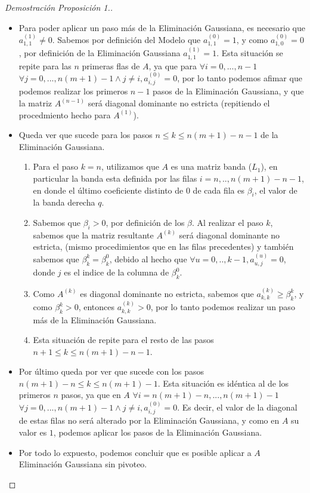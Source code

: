 \begin{proof}[Demostración Proposición 1.]
\begin{itemize}
\item Para poder aplicar un paso más de la Eliminación Gaussiana, es necesario que $a^{(1)}_{1,1} \neq 0$. Sabemos por definición del Modelo que $a^{(0)}_{1,1} = 1$, y como $a^{(0)}_{1,0} = 0$, por definición de la Eliminación Gaussiana $a^{(1)}_{1,1} = 1$. Esta situación se repite para las $n$ primeras flas de $A$, ya que para $\forall i=0,...,n-1$ $\forall j=0,...,n(m+1)-1 \land j \neq i, a^{(0)}_{i,j} = 0$, por lo tanto podemos afimar que podemos realizar los primeros $n-1$ pasos de la Eliminación Gaussiana, y que la matriz $A^{(n-1)}$ será diagonal dominante no estricta (repitiendo el procedmiento hecho para $A^{(1)}$).

\item Queda ver que sucede para los pasos $n \leq k \leq n(m+1)-n-1$ de la Eliminación Gaussiana. 
  \begin{enumerate}[label=\Roman*]
      \item Para el paso $k=n$, utilizamos que $A$ es una matriz banda ($L_{1}$), en particular la banda esta definida por las filas $i=n,..,n(m+1)-n-1$, en donde el último coeficiente distinto de 0 de cada fila es $\beta_{i}$, el valor de la banda derecha $q$. 
      \item Sabemos que $\beta_{i} > 0$, por definición de los $\beta$. Al realizar el paso $k$, sabemos que la matriz resultante $A^{(k)}$ será diagonal dominante no estricta, (mismo procedimientos que en las filas precedentes) y también sabemos que $\beta^{k}_{k} = \beta^{0}_{k}$, debido al hecho que $\forall u=0,..,k-1, a^{(u)}_{u,j} = 0$, donde $j$ es el indice de la columna de $\beta^{0}_{k}$.
      \item Como $A^{(k)}$ es diagonal dominante no estricta, sabemos que $a^{(k)}_{k,k} \geq \beta^{k}_{k}$, y como $\beta^{k}_{k} > 0$, entonces $a^{(k)}_{k,k} > 0$, por lo tanto podemos realizar un paso más de la Eliminación Gaussiana. 
      \item Esta situación de repite para el resto de las pasos $n+1 \leq k \leq n(m+1)-n-1$.
  \end{enumerate}  
\item Por último queda por ver que sucede con los pasos $ n(m+1)-n \leq k \leq n(m+1)-1$. Esta situación es idéntica al de los primeros $n$ pasos, ya que en $A$  $\forall i=n(m+1)-n,...,n(m+1)-1$ $\forall j=0,...,n(m+1)-1 \land j \neq i, a^{(0)}_{i,j} = 0$. Es decir, el valor de la diagonal de estas filas no será alterado por la Eliminación Gaussiana, y como en $A$ su valor es $1$, podemos aplicar los pasos de la Eliminación Gaussiana.

\item Por todo lo expuesto, podemos concluir que es posible aplicar a $A$ Eliminación Gaussiana sin pivoteo.

\end{itemize}

\end{proof}
